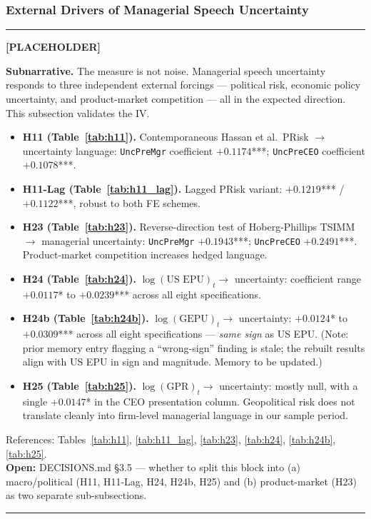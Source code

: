 \documentclass[11pt,a4paper,twocolumn]{article}
\newenvironment{placeholder}{%
  \par\medskip\noindent%
  {\color{placeholderaccent}\rule{\linewidth}{0.4pt}}\par%
  \noindent\textbf{\color{placeholderaccent}[PLACEHOLDER]}\par%
  \smallskip\itshape%
}{%
  \par\upshape\smallskip%
  {\color{placeholderaccent}\rule{\linewidth}{0.4pt}}\par\medskip%
}
\begin{document}
\subsubsection{External Drivers of Managerial Speech Uncertainty}
\label{sec:appII_drivers}
\begin{placeholder}
\textbf{Subnarrative.} The measure is not noise. Managerial speech
uncertainty responds to three independent external forcings ---
political risk, economic policy uncertainty, and product-market
competition --- all in the expected direction. This subsection
validates the IV.
\begin{itemize}
  \item \textbf{H11 (Table~\ref{tab:h11}).} Contemporaneous
        Hassan et al.\ PRisk $\to$ uncertainty language:
        \texttt{UncPreMgr} coefficient $+0.1174$***;
        \texttt{UncPreCEO} coefficient $+0.1078$***.
  \item \textbf{H11-Lag (Table~\ref{tab:h11_lag}).} Lagged PRisk
        variant: $+0.1219$*** / $+0.1122$***, robust to both FE
        schemes.
  \item \textbf{H23 (Table~\ref{tab:h23}).} Reverse-direction test of
        Hoberg-Phillips TSIMM $\to$ managerial uncertainty:
        \texttt{UncPreMgr} $+0.1943$***; \texttt{UncPreCEO}
        $+0.2491$***. Product-market competition increases hedged
        language.
  \item \textbf{H24 (Table~\ref{tab:h24}).} $\log(\text{US EPU})_t \to$
        uncertainty: coefficient range $+0.0117$* to $+0.0239$*** across
        all eight specifications.
  \item \textbf{H24b (Table~\ref{tab:h24b}).} $\log(\text{GEPU})_t
        \to$ uncertainty: $+0.0124$* to $+0.0309$*** across all eight
        specifications --- \emph{same sign} as US EPU.
        (Note: prior memory entry flagging a ``wrong-sign'' finding is
        stale; the rebuilt results align with US EPU in sign and
        magnitude. Memory to be updated.)
  \item \textbf{H25 (Table~\ref{tab:h25}).} $\log(\text{GPR})_t \to$
        uncertainty: mostly null, with a single $+0.0147$* in the
        CEO presentation column. Geopolitical risk does not
        translate cleanly into firm-level managerial language in our
        sample period.
\end{itemize}
References: Tables~\ref{tab:h11}, \ref{tab:h11_lag}, \ref{tab:h23},
\ref{tab:h24}, \ref{tab:h24b}, \ref{tab:h25}.\\
\textbf{Open:} DECISIONS.md \S3.5 --- whether to split this block into
(a) macro/political (H11, H11-Lag, H24, H24b, H25) and
(b) product-market (H23) as two separate sub-subsections.
\end{placeholder}
\end{document}
